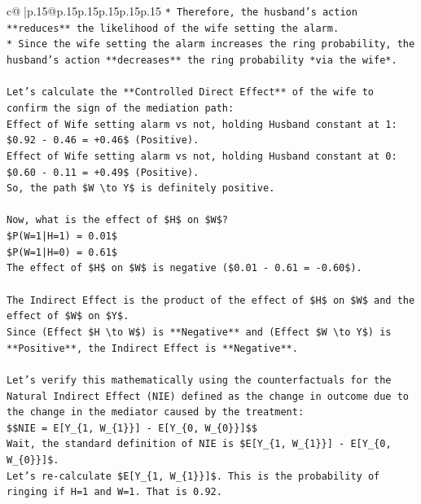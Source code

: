 \documentclass{article}
\begin{document}
{\begin{supertabular}{c@{$\;$}|p{.15\linewidth}@{}p{.15\linewidth}p{.15\linewidth}p{.15\linewidth}p{.15\linewidth}p{.15\linewidth}}
{{{\texttt{*   Therefore, the husband's action **reduces** the likelihood of the wife setting the alarm.} \\
\texttt{*   Since the wife setting the alarm increases the ring probability, the husband's action **decreases** the ring probability *via the wife*.} \\
\\ 
\texttt{Let's calculate the **Controlled Direct Effect** of the wife to confirm the sign of the mediation path:} \\
\texttt{Effect of Wife setting alarm vs not, holding Husband constant at 1:} \\
\texttt{\$0.92 {-} 0.46 = +0.46\$ (Positive).} \\
\texttt{Effect of Wife setting alarm vs not, holding Husband constant at 0:} \\
\texttt{\$0.60 {-} 0.11 = +0.49\$ (Positive).} \\
\texttt{So, the path \$W \textbackslash{}to Y\$ is definitely positive.} \\
\\ 
\texttt{Now, what is the effect of \$H\$ on \$W\$?} \\
\texttt{\$P(W=1|H=1) = 0.01\$} \\
\texttt{\$P(W=1|H=0) = 0.61\$} \\
\texttt{The effect of \$H\$ on \$W\$ is negative (\$0.01 {-} 0.61 = {-}0.60\$).} \\
\\ 
\texttt{The Indirect Effect is the product of the effect of \$H\$ on \$W\$ and the effect of \$W\$ on \$Y\$.} \\
\texttt{Since (Effect \$H \textbackslash{}to W\$) is **Negative** and (Effect \$W \textbackslash{}to Y\$) is **Positive**, the Indirect Effect is **Negative**.} \\
\\ 
\texttt{Let's verify this mathematically using the counterfactuals for the Natural Indirect Effect (NIE) defined as the change in outcome due to the change in the mediator caused by the treatment:} \\
\texttt{\$\$NIE = E{[}Y\_\{1, W\_\{1\}\}{]} {-} E{[}Y\_\{0, W\_\{0\}\}{]}\$\$} \\
\texttt{Wait, the standard definition of NIE is \$E{[}Y\_\{1, W\_\{1\}\}{]} {-} E{[}Y\_\{0, W\_\{0\}\}{]}\$.} \\
\texttt{Let's re{-}calculate \$E{[}Y\_\{1, W\_\{1\}\}{]}\$. This is the probability of ringing if H=1 and W=1. That is 0.92.} \\
}}}
\end{supertabular}}
\end{document}
